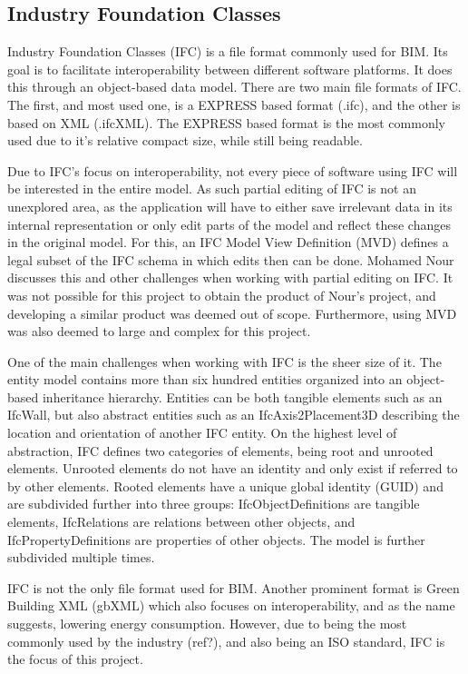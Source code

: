 \subsection{Industry Foundation Classes}
Industry Foundation Classes (IFC) is a file format commonly used for BIM. Its goal is to facilitate interoperability between different software platforms. It does this through an object-based data model. There are two main file formats of IFC. The first, and most used one, is a EXPRESS based format (.ifc), and the other is based on XML (.ifcXML). The EXPRESS based format is the most commonly used due to it's relative compact size, while still being readable. 

Due to IFC's focus on interoperability, not every piece of software using IFC will be interested in the entire model. As such partial editing of IFC is not an unexplored area, as the application will have to either save irrelevant data in its internal representation or only edit parts of the model and reflect these changes in the original model. For this, an IFC Model View Definition (MVD) defines a legal subset of the IFC schema\cite{mvd} in which edits then can be done. Mohamed Nour discusses this and other challenges when working with partial editing on IFC\cite{nour08}. It was not possible for this project to obtain the product of Nour's project, and developing a similar product was deemed out of scope. Furthermore, using MVD was also deemed to large and complex for this project.

One of the main challenges when working with IFC is the sheer size of it. The entity model contains more than six hundred entities organized into an object-based inheritance hierarchy. Entities can be both tangible elements such as an IfcWall, but also abstract entities such as an IfcAxis2Placement3D describing the location and orientation of another IFC entity. On the highest level of abstraction, IFC defines two categories of elements, being root and unrooted elements. Unrooted elements do not have an identity and only exist if referred to by other elements. Rooted elements have a unique global identity (GUID) and are subdivided further into three groups: IfcObjectDefinitions are tangible elements, IfcRelations are relations between other objects, and IfcPropertyDefinitions are properties of other objects. The model is further subdivided multiple times. 

IFC is not the only file format used for BIM. Another prominent format is Green Building XML (gbXML) which also focuses on interoperability, and as the name suggests, lowering energy consumption. However, due to being the most commonly used by the industry (ref?), and also being an ISO standard, IFC is the focus of this project.
